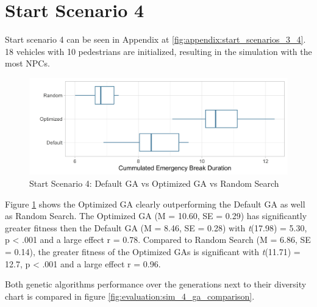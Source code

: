 \section{Start Scenario 4}
Start scenario 4 can be seen in Appendix at \ref{fig:appendix:start_scenarios_3_4}. 18 vehicles with 10 pedestrians are initialized, resulting in the simulation with the most NPCs.

\begin{figure}[ht] 
	\label{fig:evaluation:sim_4_comparison}
	\includegraphics[width=1\linewidth]{simulations/evaluation/plots/sim_4_comparison}
	\caption{Start Scenario 4: Default GA vs Optimized GA vs Random Search}
\end{figure}

Figure \ref{fig:evaluation:sim_4_comparison} shows the Optimized GA clearly outperforming the Default GA as well as Random Search.
The Optimized GA (M = 10.60, SE = 0.29) has significantly greater fitness then the Default GA (M = 8.46, SE = 0.28) with \textit{t}(17.98) = 5.30, p < .001 and a large effect r = 0.78.
Compared to Random Search (M = 6.86, SE = 0.14), the greater fitness of the Optimized GAs is significant with \textit{t}(11.71) = 12.7, p < .001 and a large effect r = 0.96.

Both genetic algorithms performance over the generations next to their diversity chart is compared in figure \ref{fig:evaluation:sim_4_ga_comparison}.

